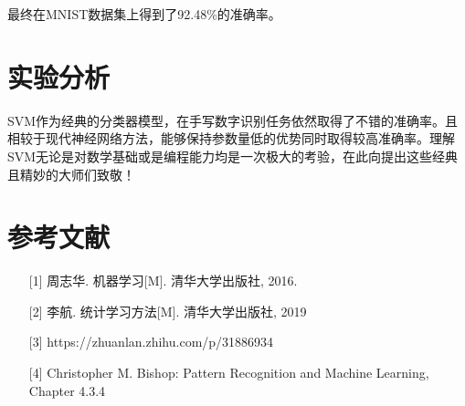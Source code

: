 \documentclass{progartcn}
\begin{document}
最终在MNIST数据集上得到了92.48\%的准确率。

\section{实验分析}
SVM作为经典的分类器模型，在手写数字识别任务依然取得了不错的准确率。且相较于现代神经网络方法，能够保持参数量低的优势同时取得较高准确率。理解SVM无论是对数学基础或是编程能力均是一次极大的考验，在此向提出这些经典且精妙的大师们致敬！


\section{参考文献}
\begin{enumerate}[itemsep=0.01pt]
	\item[] [1] 周志华. 机器学习[M]. 清华大学出版社, 2016.
	\item[] [2] 李航. 统计学习方法[M]. 清华大学出版社, 2019
	\item[] [3] https://zhuanlan.zhihu.com/p/31886934 
	\item[] [4] Christopher M. Bishop: Pattern Recognition and Machine Learning, Chapter 4.3.4
\end{enumerate}




\end{document}
